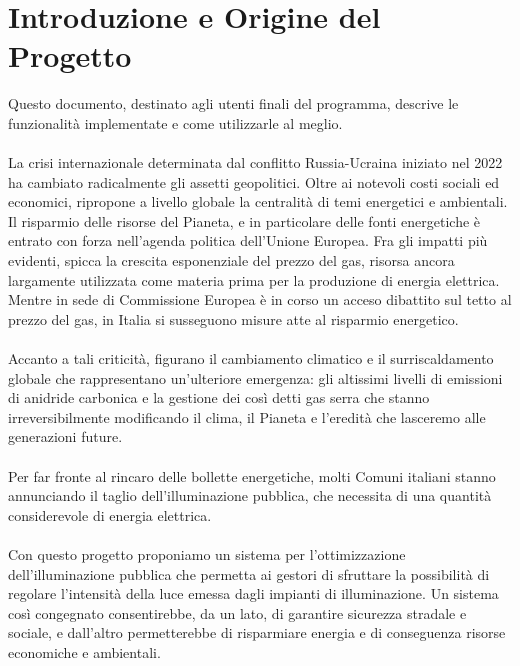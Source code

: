 \documentclass[a4paper, 12pt]{article}
\begin{document}
\makeindexdetails
\makefrontpage \makeversioni
\tableofcontents
\newpage
\clearpage
{}
\newpage
\listoffigures
\newpage
\section{Introduzione e Origine del Progetto}
Questo documento, destinato agli utenti finali del programma, descrive le funzionalità implementate e come utilizzarle al meglio.\\ \\
La crisi internazionale determinata dal conflitto Russia-Ucraina iniziato nel 2022 ha cambiato radicalmente gli assetti geopolitici. Oltre ai notevoli costi sociali ed economici, ripropone a livello globale la centralità di temi energetici e ambientali.\\
Il risparmio delle risorse del Pianeta, e in particolare delle fonti energetiche è entrato con forza nell'agenda politica dell'Unione Europea. Fra gli impatti più evidenti, spicca la crescita esponenziale del prezzo del gas, risorsa ancora largamente utilizzata come materia prima per la produzione di energia elettrica. Mentre in sede di Commissione Europea è in corso un acceso dibattito sul tetto al prezzo del gas, in Italia si susseguono misure atte al risparmio energetico.\\\\
Accanto a tali criticità, figurano il cambiamento climatico e il surriscaldamento globale che rappresentano un'ulteriore emergenza: gli altissimi livelli di emissioni di anidride carbonica e la gestione dei così detti gas serra che stanno irreversibilmente modificando il clima, il Pianeta e l'eredità che lasceremo alle generazioni future.\\\\
Per far fronte al rincaro delle bollette energetiche, molti Comuni italiani stanno annunciando il taglio dell'illuminazione pubblica, che necessita di una quantità considerevole di energia elettrica.\\\\
Con questo progetto proponiamo un sistema per l'ottimizzazione dell'illuminazione pubblica che permetta ai gestori di sfruttare la possibilità di regolare l'intensità della luce emessa dagli impianti di illuminazione. Un sistema così congegnato consentirebbe, da un lato, di garantire sicurezza stradale e sociale, e dall'altro permetterebbe di risparmiare energia e di conseguenza risorse economiche e ambientali.
\end{document}
